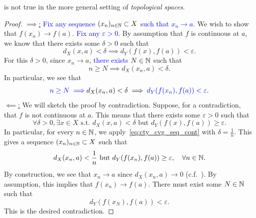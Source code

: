 \begin{rem}
	 is not true in the more general setting of \textit{topological spaces}.
\end{rem}
\begin{proof}
	\ul{$\implies$:} \textcolor{blue}{Fix any sequence $(x_n)_{n\in\mathbb{N}}\subset X$ such that $x_n \to a$.} We wish to show that $f(x_n)\to f(a)$. \textcolor{blue}{Fix any $\varepsilon>0$.} By assumption that $f$ is continuous at $a$, we know that there exists some $\delta>0$ such that
	\[
	d_X(x,a) < \delta \implies d_Y(f(x),f(a))<\varepsilon.
	\]
	For this $\delta>0$, since $x_n \to a$, \textcolor{blue}{there exists $N\in\mathbb{N}$} such that
	\[
	n\ge N \implies d_X(x_n,a)<\delta.
	\]
	In particular, we see that
	\[
	\textcolor{blue}{n\ge N\implies} d_X(x_n,a)<\delta \implies \textcolor{blue}{d_Y(f(x_n),f(a))<\varepsilon}.
	\]
	\ul{$\impliedby$:} We will sketch the proof by contradiction. Suppose, for a contradiction, that $f$ is not continuous at $a$. This means that there exists some $\varepsilon>0$ such that
	\begin{equation}
		\label{eq:cty_cvg_seq_cont}
		\forall \delta>0,\exists x\in X\text{ s.t. }d_X(x,a)<\delta\text{ but }d_Y(f(x),f(a))\ge \varepsilon.
	\end{equation}
	In particular, for every $n\in\mathbb{N}$, we apply~\eqref{eq:cty_cvg_seq_cont} with $\delta = \frac{1}{n}$. This gives a sequence $(x_n)_{n\in\mathbb{N}}\subset X$ such that
	\[
	d_X(x_n,a)<\frac{1}{n}\text{ but }d_Y(f(x_n),f(a))\ge \varepsilon,\quad \forall n\in\mathbb{N}.
	\]
	By construction, we see that $x_n\to a$ since $d_X(x_n,a) \to 0$ (c.f.~). By assumption, this implies that $f(x_n)\to f(a)$. There must exist some $N\in\mathbb{N}$ such that
	\[
	d_Y(f(x_N),f(a))<\varepsilon.
	\]
	This is the desired contradiction.
\end{proof}